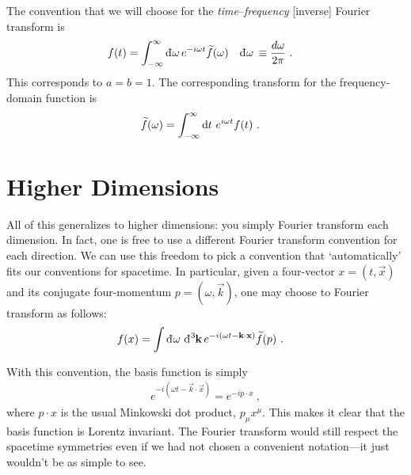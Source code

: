 \documentclass[12pt, oneside]{report}    %
\let\oldsection\section
\def\section{%
  \setcounter{sidenote}{1}%
  \oldsection
}
\begin{document}
The convention that we will choose for the \emph{time}--\emph{frequency} [inverse] Fourier transform is
\begin{align}
  f(t) &= \int_{-\infty}^{\infty} \Dbar\omega e^{-i\omega t} \tilde f(\omega)
  &
  \Dbar\omega &\equiv\frac{d\omega}{2\pi} \ .
\end{align}
This corresponds to $a=b=1$. The corresponding transform for the frequency-domain function is
\begin{align}
  \widetilde f(\omega) &= 
  \int_{-\infty}^\infty \operatorname{d}\mkern-3mu^{}\mkern-1mu{t}\,\, e^{i\omega t} f(t) \ .
  \label{eq:inverse:fourier:convention}
\end{align}

\section{Higher Dimensions}

All of this generalizes to higher dimensions: you simply Fourier transform each dimension. In fact, one is free to use a different Fourier transform convention for each direction. We can use this freedom to pick a convention that `automatically' fits our conventions for spacetime. In particular, given a four-vector $x=(t,\vec{x})$ and its conjugate four-momentum $p=(\omega, \vec{k})$, one may choose to Fourier transform as follows: 
\begin{align}
  f(x) &= \int \Dbar\omega \Dbar[3]{\vec{k}} e^{-i(\omega t-\vec{k}\cdot\vec{x})} \tilde f(p)
  \ .
\end{align}

 

With this convention, the basis function is simply
\begin{align}
  e^{-i(\omega t-\vec{k}\cdot\vec{x})} 
  = e^{-ip\cdot x} \ , 
\end{align}
where $p\cdot x$ is the usual Minkowski dot product, $p_\mu x^\mu$. This makes it clear that the basis function is Lorentz invariant. The Fourier transform would still respect the spacetime symmetries even if we had not chosen a convenient notation---it just wouldn't be as simple to see.
\end{document}
